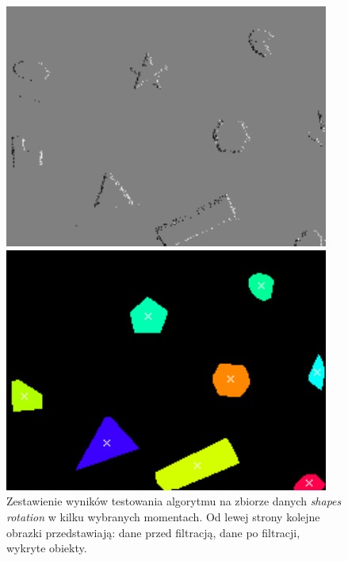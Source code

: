 \begin{figure}
\begin{minipage}{0.33\textwidth}
    \end{minipage}
        \begin{minipage}{0.33\textwidth}
        \centering
        \includegraphics[width = 0.95\textwidth]{images/filtered_shapes3.png}
    \end{minipage}\hfill
    \begin{minipage}{0.33\textwidth}
        \centering
        \includegraphics[width = 0.95\textwidth]{images/obst_shapes3.png}
    \end{minipage}\hfill
    \caption{Zestawienie wyników testowania algorytmu na zbiorze danych \textit{shapes rotation} w kilku wybranych momentach. Od lewej strony kolejne obrazki przedstawiają: dane przed filtracją, dane po filtracji, wykryte obiekty.}
    \label{fig:shapes_overview}
\end{figure}


